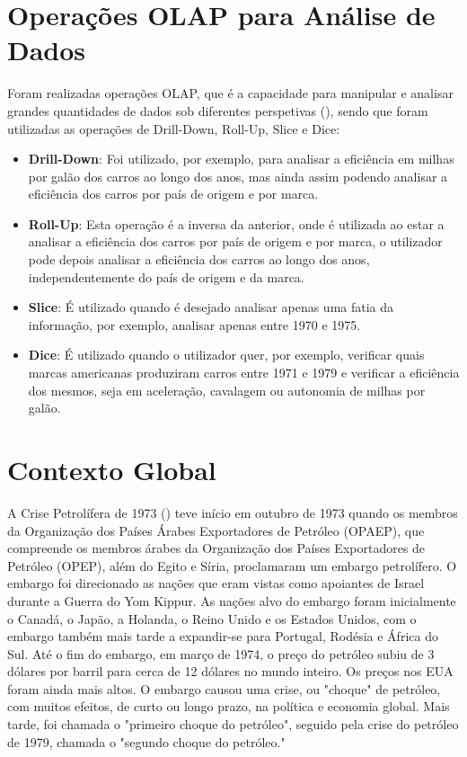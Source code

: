 \documentclass[a4paper]{article}
\begin{document}
\section{Operações OLAP para Análise de Dados}\label{olap}
Foram realizadas operações OLAP, que é a capacidade para manipular e analisar grandes quantidades de dados sob diferentes perspetivas (\cite{moodle}), 
sendo que foram utilizadas as operações de Drill-Down, Roll-Up, Slice e Dice:
\begin{itemize}
    \item \textbf{Drill-Down}: Foi utilizado, por exemplo, para analisar a eficiência em milhas por galão dos carros ao longo dos anos,
    mas ainda assim podendo analisar a eficiência dos carros por país de origem e por marca.
    \item \textbf{Roll-Up}: Esta operação é a inversa da anterior, onde é utilizada ao estar a analisar a eficiência dos carros por país 
    de origem e por marca, o utilizador pode depois analisar a eficiência dos carros ao longo dos anos, independentemente do país de origem e da marca.    
    \item \textbf{Slice}: É utilizado quando é desejado analisar apenas uma fatia da informação, por exemplo, analisar apenas entre 1970 e 1975.
    \item \textbf{Dice}: É utilizado quando o utilizador quer, por exemplo, verificar quais marcas americanas produziram carros entre 1971 e 1979 e 
    verificar a eficiência dos mesmos, seja em aceleração, cavalagem ou autonomia de milhas por galão. 
\end{itemize}
\newpage
\section{Contexto Global}\label{cg}

A Crise Petrolífera de 1973 (\cite{pet73}) teve início em outubro de 1973 quando os membros da 
Organização dos Países Árabes Exportadores de Petróleo (OPAEP), que compreende os membros árabes da 
Organização dos Países Exportadores de Petróleo (OPEP), além do Egito e Síria, proclamaram um embargo petrolífero. 
O embargo foi direcionado as nações que eram vistas como apoiantes de Israel durante a Guerra do Yom Kippur. 
As nações alvo do embargo foram inicialmente o Canadá, o Japão, a Holanda, o Reino Unido e os Estados Unidos, 
com o embargo também mais tarde a expandir-se para Portugal, Rodésia e África do Sul. Até o fim do embargo, em março de 1974, 
o preço do petróleo subiu de 3 dólares por barril para cerca de 12 dólares no mundo inteiro. Os preços nos EUA foram ainda mais altos. 
O embargo causou uma crise, ou "choque" de petróleo, com muitos efeitos, de curto ou longo prazo, na política e economia global. 
Mais tarde, foi chamada o "primeiro choque do petróleo", seguido pela crise do petróleo de 1979, chamada o "segundo choque do petróleo."
\end{document}
